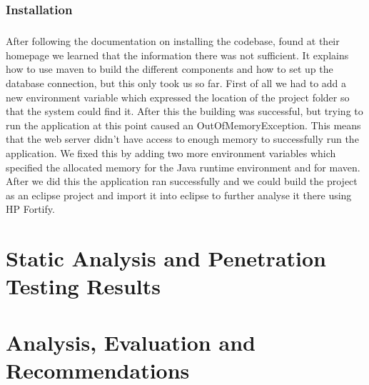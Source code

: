 \documentclass[11pt,english,a4paper]{report}
\begin{document}
\subsection{Installation}
\paragraph{}
After following the documentation on installing the codebase, found at their homepage we learned that the information there was not sufficient.
It explains how to use maven to build the different components and how to set up the database connection, but this only took us so far.
First of all we had to add a new environment variable which expressed the location of the project folder so that the system could find it.
After this the building was successful, but trying to run the application at this point caused an OutOfMemoryException. 
This means that the web server didn't have access to enough memory to successfully run the application. 
We fixed this by adding two more environment variables which specified the allocated memory for the Java runtime environment and for maven.
After we did this the application ran successfully and we could build the project as an eclipse project and import it into eclipse to further analyse it there using HP Fortify.



\chapter{Static Analysis and Penetration Testing Results}
\chapter{Analysis, Evaluation and Recommendations}
\end{document}

